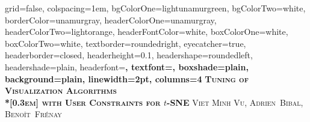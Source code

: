 \documentclass[portrait,final,a0paper]{nadiposter}
\begin{document}







\begin{poster}%
  {
  grid=false,
  colspacing=1em,
  bgColorOne=lightunamurgreen,
  bgColorTwo=white,
  borderColor=unamurgray,
  headerColorOne=unamurgray,
  headerColorTwo=lightorange,
  headerFontColor=white,
  boxColorOne=white,
  boxColorTwo=white,
  textborder=roundedright,
  eyecatcher=true,
  headerborder=closed,
  headerheight=0.1\textheight,
  headershape=roundedleft,
  headershade=plain,
  headerfont=\Large\bf\textsc, %
  textfont={\setlength{\parindent}{1.5em}},
  boxshade=plain,
  background=plain,
  linewidth=2pt,
  columns=4
  }
  {\hbox{} } %
  {\bf\textsc{Tuning of Visualization Algorithms\\*[0.3em] with User Constraints for $t$-SNE}\vspace{0.5em}}
  {\textsc{Viet Minh Vu, Adrien~Bibal,  Beno\^it~Fr\'enay} } %
  {%
   \hbox{} %
  }



\sectionfont{\centering}

\end{poster}
\end{document}
